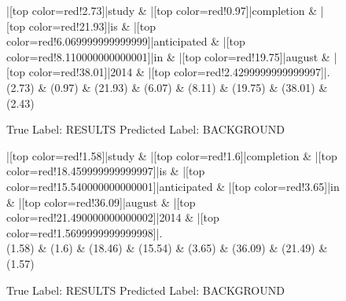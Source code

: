 \documentclass[a4paper, landscape]{article}
\begin{document}
\begin{figure}
\begin{center}
\begin{dependency}
\begin{deptext}
|[top color=red!2.73]|study \& |[top color=red!0.97]|completion \& |[top color=red!21.93]|is \& |[top color=red!6.069999999999999]|anticipated \& |[top color=red!8.110000000000001]|in \& |[top color=red!19.75]|august \& |[top color=red!38.01]|2014 \& |[top color=red!2.4299999999999997]|.\\
(2.73) \& (0.97) \& (21.93) \& (6.07) \& (8.11) \& (19.75) \& (38.01) \& (2.43)\\
\end{deptext}
\end{dependency}
\end{center}
\caption{True Label: RESULTS Predicted Label: BACKGROUND}
\end{figure}
\clearpage
\begin{figure}
\begin{center}
\begin{dependency}
\begin{deptext}
|[top color=red!1.58]|study \& |[top color=red!1.6]|completion \& |[top color=red!18.459999999999997]|is \& |[top color=red!15.540000000000001]|anticipated \& |[top color=red!3.65]|in \& |[top color=red!36.09]|august \& |[top color=red!21.490000000000002]|2014 \& |[top color=red!1.5699999999999998]|.\\
(1.58) \& (1.6) \& (18.46) \& (15.54) \& (3.65) \& (36.09) \& (21.49) \& (1.57)\\
\end{deptext}
\end{dependency}
\end{center}
\caption{True Label: RESULTS Predicted Label: BACKGROUND}
\end{figure}
\clearpage
\end{document}
